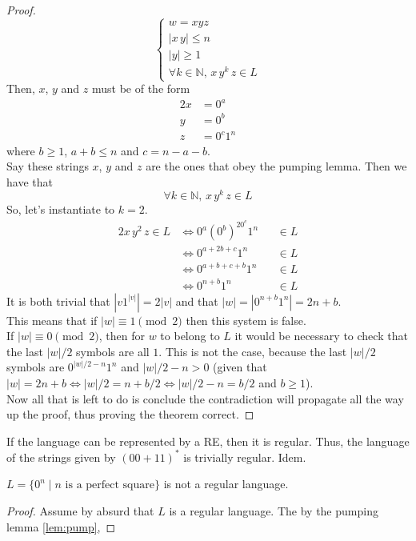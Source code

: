 \documentclass[docid=TP07]{tcom_TP}
\begin{document}
{\begin{proof}
\begin{equation*}
\begin{cases}
	w = xyz \\
	|x\,y| \leq n\\
	|y| \geq 1\\
	\forall k \in \mathbb{N},\,x\,y^k\,z \in L
\end{cases}
\end{equation*}
Then, $x$, $y$ and $z$ must be of the form
\begin{alignat*}{2}
	x &= 0^a\\
	y &= 0^b\\
	z &= 0^c1^{n}
\end{alignat*}
where $b \geq 1$, $a+b \leq n$ and $c=n-a-b$.\\
Say these strings $x$, $y$ and $z$ are the ones that obey the pumping lemma. Then we have that
\begin{equation*}
	\forall k \in \mathbb{N},\,x\,y^k\,z \in L
\end{equation*}
So, let's instantiate to $k=2$.
\begin{alignat*}{2}
	x\,y^2\,z \in L
	& \iff 0^a(0^b)^20^c1^n &&\in L \\
	& \iff 0^{a+2b+c}1^n    &&\in L \\
	& \iff 0^{a+b+c+b}1^n   &&\in L \\
	& \iff 0^{n+b}1^n       &&\in L
\end{alignat*}
It is both trivial that $|v 1^{|v|} | = 2|v|$ and that $|w|=|0^{n+b}1^n|=2n+b$.\\
This means that if $|w| \equiv 1 \pmod{2}$ then this system is false.\\
If $|w| \equiv 0 \pmod{2}$, then for $w$ to belong to $L$ it would be necessary to check that the last $|w|/2$ symbols are all $1$. This is not the case, because the last $|w|/2$ symbols are $0^{|w|/2-n}1^n$ and $|w|/2-n > 0$ (given that $|w|=2n+b \iff |w|/2=n+b/2 \iff |w|/2-n=b/2$ and $b \geq 1$).\\
Now all that is left to do is conclude the contradiction will propagate all the way up the proof, thus proving the theorem correct.
\end{proof}
If the language can be represented by a RE, then it is regular. Thus, the language of the strings given by $(00+11)^*$ is trivially regular.
Idem.
\begin{theorem}
$L=\{0^n\mid n \text{ is a perfect square}\}$ is not a regular language.
\end{theorem}
\begin{proof}
Assume  by absurd that $L$ is a regular language. The by the pumping lemma \eqref{lem:pump},

\end{proof}}
\end{document}
